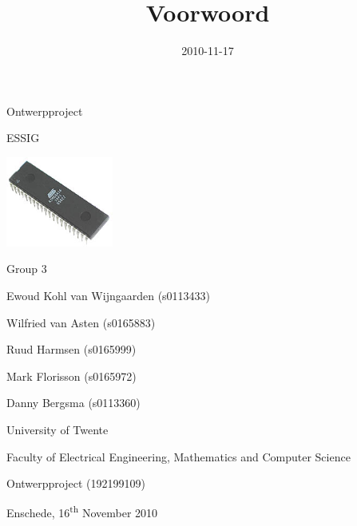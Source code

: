\documentclass[a4paper]{article}
\title{Voorwoord}
\author{}
\date{2010-11-17}
\begin{document}
\clearpage\setcounter{page}{2}\pagestyle{Standard}
\subparagraph[]{\rmfamily\bfseries }
\subparagraph[]{\rmfamily\bfseries }

\bigskip

{\centering{}\sffamily
Ontwerpproject
\par}

{\centering{}\sffamily
ESSIG
\par}


\bigskip


\bigskip

{\centering \par}

\begin{center}
\includegraphics[width=3.53cm,height=2.96cm]{Essig-img001.jpg}
\end{center}

\bigskip


\bigskip


\bigskip


\bigskip

{\sffamily
Group 3}


\bigskip

{\sffamily
Ewoud Kohl van Wijngaarden (s0113433)}

{\sffamily
Wilfried van Asten (s0165883)}

{\sffamily
Ruud Harmsen (s0165999)}

{\sffamily
Mark Florisson (s0165972)}

{\sffamily
Danny Bergsma (s0113360)}


\bigskip

{\sffamily
University of Twente}

{\sffamily
Faculty of Electrical Engineering, Mathematics and Computer Science}

{\sffamily
Ontwerpproject (192199109)}


\bigskip

{\sffamily
Enschede, 16\textsuperscript{th} November 2010}
\end{document}
